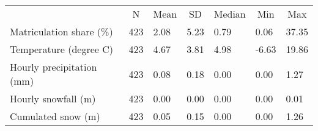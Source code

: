 
\begin{tabular}[t]{lllllll}
\toprule
\multicolumn{1}{c}{ } & \multicolumn{1}{c}{N} & \multicolumn{1}{c}{Mean} & \multicolumn{1}{c}{SD} & \multicolumn{1}{c}{Median} & \multicolumn{1}{c}{Min} & \multicolumn{1}{c}{Max} \\
\cmidrule(l{3pt}r{3pt}){2-2} \cmidrule(l{3pt}r{3pt}){3-3} \cmidrule(l{3pt}r{3pt}){4-4} \cmidrule(l{3pt}r{3pt}){5-5} \cmidrule(l{3pt}r{3pt}){6-6} \cmidrule(l{3pt}r{3pt}){7-7}
Matriculation share (\%) & 423 & 2.08 & 5.23 & 0.79 & 0.06 & 37.35\\
Temperature (degree C) & 423 & 4.67 & 3.81 & 4.98 & -6.63 & 19.86\\
Hourly precipitation (mm) & 423 & 0.08 & 0.18 & 0.00 & 0.00 & 1.27\\
Hourly snowfall (m) & 423 & 0.00 & 0.00 & 0.00 & 0.00 & 0.01\\
Cumulated snow (m) & 423 & 0.05 & 0.15 & 0.00 & 0.00 & 1.26\\
\bottomrule
\end{tabular}
